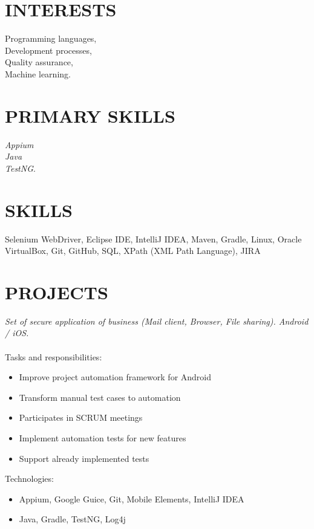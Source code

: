 \documentclass[margin, 10pt]{Stylesheet}
\begin{document}
\begin{resume}

\section{INTERESTS}

Programming languages,\\
Development processes,\\
Quality assurance, \\
Machine learning.

\section{PRIMARY SKILLS}
\emph{Appium} \\
\emph{Java} \\
\emph{TestNG}.

\section{SKILLS}
Selenium WebDriver, Eclipse IDE, IntelliJ IDEA‍, Maven, Gradle, Linux, Oracle VirtualBox, Git, GitHub, SQL, XPath (XML Path Language), JIRA

\section{PROJECTS}
\emph{Set of secure application of business (Mail client, Browser, File sharing). Android / iOS.} \\ \\
Tasks and responsibilities:
\begin{itemize} \itemsep -2pt
	\item Improve project automation framework for Android
	\item Transform manual test cases to automation
	\item Participates in SCRUM meetings
	\item Implement automation tests for new features
	\item Support already implemented tests
\end{itemize}
Technologies:
\begin{itemize} \itemsep -2pt
	\item Appium, Google Guice, Git, Mobile Elements, IntelliJ IDEA
	\item Java, Gradle, TestNG, Log4j
\end{itemize}


\end{resume}
\end{document}
